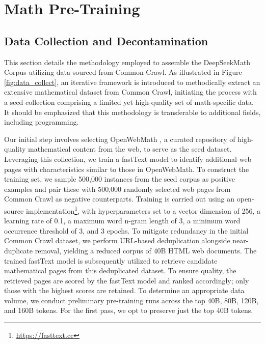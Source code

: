 \section{Math Pre-Training}

\subsection{Data Collection and Decontamination} This section details the methodology employed to assemble the DeepSeekMath Corpus utilizing data sourced from Common Crawl. As illustrated in Figure \ref{fig:data_collect}, an iterative framework is introduced to methodically extract an extensive mathematical dataset from Common Crawl, initiating the process with a seed collection comprising a limited yet high-quality set of math-specific data. It should be emphasized that this methodology is transferable to additional fields, including programming.

Our initial step involves selecting OpenWebMath \citep{openwebmath}, a curated repository of high-quality mathematical content from the web, to serve as the seed dataset. Leveraging this collection, we train a fastText model \citep{joulin2016fasttext} to identify additional web pages with characteristics similar to those in OpenWebMath. To construct the training set, we sample 500,000 instances from the seed corpus as positive examples and pair these with 500,000 randomly selected web pages from Common Crawl as negative counterparts. Training is carried out using an open-source implementation\footnote{\url{https://fasttext.cc}}, with hyperparameters set to a vector dimension of 256, a learning rate of 0.1, a maximum word n-gram length of 3, a minimum word occurrence threshold of 3, and 3 epochs. To mitigate redundancy in the initial Common Crawl dataset, we perform URL-based deduplication alongside near-duplicate removal, yielding a reduced corpus of 40B HTML web documents. The trained fastText model is subsequently utilized to retrieve candidate mathematical pages from this deduplicated dataset. To ensure quality, the retrieved pages are scored by the fastText model and ranked accordingly; only those with the highest scores are retained. To determine an appropriate data volume, we conduct preliminary pre-training runs across the top 40B, 80B, 120B, and 160B tokens. For the first pass, we opt to preserve just the top 40B tokens.

